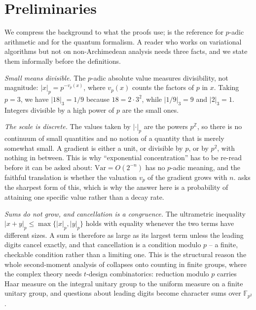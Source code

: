 \documentclass{ceurart}
\theoremstyle{plain}
\theoremstyle{definition}
\theoremstyle{remark}
\theoremstyle{plain}
\newcommand{\padicnorm}[1]{\left|#1\right|_p}
\newcommand{\FF}{\mathbb{F}}
\begin{document}
\section{Preliminaries}
\label{sec:prelim}

We compress the background to what the proofs use; \cite{Go97} is the reference
for $p$-adic arithmetic and \cite{AMP23,AMP24} for the quantum formalism. A
reader who works on variational algorithms but not on non-Archimedean analysis
needs three facts, and we state them informally before the definitions.

\emph{Small means divisible.} The $p$-adic absolute value measures divisibility,
not magnitude: $\padicnorm x=p^{-v_p(x)}$, where $v_p(x)$ counts the factors of
$p$ in $x$. Taking $p=3$, we have $\left|18\right|_3=1/9$ because $18=2\cdot3^2$,
while $\left|1/9\right|_3=9$ and $\left|2\right|_3=1$. Integers divisible by a high power of
$p$ are the small ones.

\emph{The scale is discrete.} The values taken by $\padicnorm\cdot$ are the
powers $p^{\mathbb{Z}}$, so there is no continuum of small quantities and no
notion of a quantity that is merely somewhat small. A gradient is either a unit,
or divisible by $p$, or by $p^2$, with nothing in between. This is why
``exponential concentration'' has to be re-read before it can be asked about:
$\mathrm{Var}=O(2^{-n})$ has no $p$-adic meaning, and the faithful translation
is whether the valuation $v_p$ of the gradient grows with $n$.
 asks the sharpest form of this, which is why the answer here
is a probability of attaining one specific value rather than a decay rate.

\emph{Sums do not grow, and cancellation is a congruence.} The ultrametric
inequality $\padicnorm{x+y}\le\max\{\padicnorm x,\padicnorm y\}$ holds with
equality whenever the two terms have different sizes. A sum is therefore as
large as its largest term unless the leading digits cancel exactly, and that
cancellation is a condition modulo $p$ -- a finite, checkable condition rather
than a limiting one. This is the structural reason the whole second-moment
analysis of  collapses onto counting in finite groups, where
the complex theory needs $t$-design combinatorics: reduction modulo $p$ carries
Haar measure on the integral unitary group to the uniform measure on a finite
unitary group, and questions about leading digits become character sums over
$\FF_{p^2}$.
\end{document}
